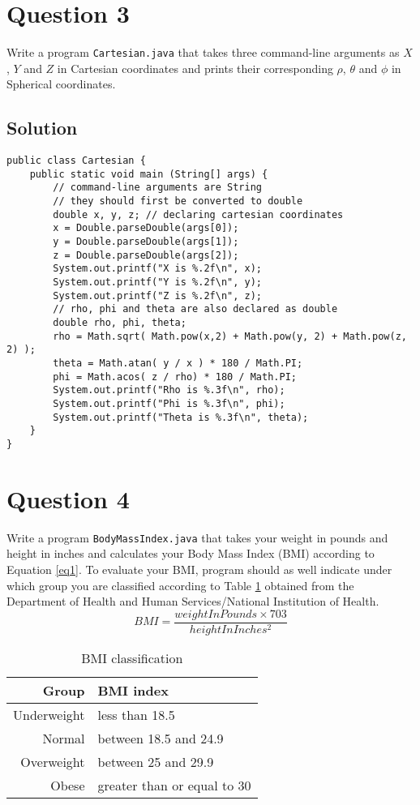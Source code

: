 \documentclass[12pt,letterpaper,twoside]{article}
\begin{document}
\section*{Question 3}

Write a program \texttt{Cartesian.java} that takes three command-line arguments as $X$, $Y$ and $Z$ in Cartesian coordinates and prints their corresponding $\rho$, $\theta$ and $\phi$ in Spherical coordinates.

\subsection*{Solution}
\lstset{language=Java,tabsize=2}
\begin{lstlisting}
public class Cartesian {
	public static void main (String[] args) {
		// command-line arguments are String
		// they should first be converted to double
		double x, y, z; // declaring cartesian coordinates
		x = Double.parseDouble(args[0]);
		y = Double.parseDouble(args[1]);
		z = Double.parseDouble(args[2]);
		System.out.printf("X is %.2f\n", x);
		System.out.printf("Y is %.2f\n", y);
		System.out.printf("Z is %.2f\n", z);
		// rho, phi and theta are also declared as double
		double rho, phi, theta;
		rho = Math.sqrt( Math.pow(x,2) + Math.pow(y, 2) + Math.pow(z, 2) );
		theta = Math.atan( y / x ) * 180 / Math.PI;
		phi = Math.acos( z / rho) * 180 / Math.PI;
		System.out.printf("Rho is %.3f\n", rho);
		System.out.printf("Phi is %.3f\n", phi);
		System.out.printf("Theta is %.3f\n", theta);
	}
}
\end{lstlisting}

\section*{Question 4}

Write a program \texttt{BodyMassIndex.java} that takes your weight in pounds and height in inches and calculates your Body Mass Index (BMI) according to Equation \ref{eq1}. To evaluate your BMI, program should as well indicate under which group you are classified according to Table \ref{tab2} obtained from the Department of Health and Human Services/National Institution of Health.
\begin{equation}
BMI = \frac{weightInPounds \times 703}{heightInInches^2}
\label{eq1}
\end{equation}
\begin{table}[H]\centering
\begin{tabular}{|r|l|}
\hline
Group & BMI index \\
\hline
Underweight & less than 18.5 \\
Normal & between 18.5 and 24.9 \\
Overweight & between 25 and 29.9 \\
Obese & greater than or equal to 30 \\
\hline
\end{tabular}
\caption{BMI classification}\label{tab2}
\end{table}
\end{document}
